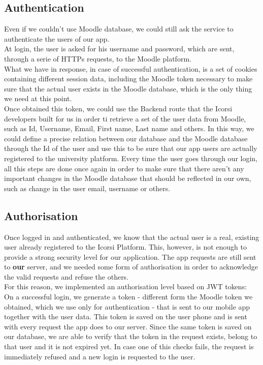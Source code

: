 \subsection{Authentication}
Even if we couldn't use Moodle database, we could still ask the service to authenticate the users of our app. \\
At login, the user is asked for his username and password, which are sent, through a serie of HTTPs requests, to the Moodle platform. \\
What we have in response, in case of successful authentication, is a set of cookies containing different session data, including the Moodle token necessary to make sure that the actual user exists in the Moodle database, which is the only thing we need at this point.\\
Once obtained this token, we could use the Backend route that the Icorsi developers built for us in order ti retrieve a set of the user data from Moodle, such as Id, Username, Email, First name, Last name and others. In this way, we could define a precise relation between our database and the Moodle database through the Id of the user and use this to be sure that our app users are actually registered to the university platform.
Every time the user goes through our login, all this steps are done once again in order to make sure that there aren't any important changes in the Moodle database that should be reflected in our own, such as change in the user email, username or others.

\subsection{Authorisation}
Once logged in and authenticated, we know that the actual user is a real, existing user already registered to the Icorsi Platform. This, however, is not enough to provide a strong security level for our application. The app requests are still sent to \textbf{our} server, and we needed some form of authorisation in order to acknowledge the valid requests and refuse the others.\\
For this reason, we implemented an authorisation level based on JWT tokens:\\
On a successful login, we generate a token - different form the Moodle token we obtained, which we use only for authentication - that is sent to our mobile app together with the user data. This token is saved on the user phone and is sent with every request the app does to our server. Since the same token is saved on our database, we are able to verify that the token in the request exists, belong to that user and it is not expired yet. In case one of this checks fails, the request is immediately refused and a new login is requested to the user. 
